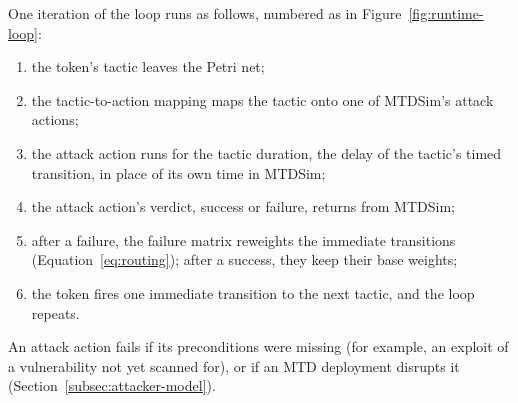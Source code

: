 \documentclass{cshonours}
\begin{document}
One iteration of the loop runs as follows, numbered as in
Figure~\ref{fig:runtime-loop}:
\begin{enumerate}[nosep, leftmargin=*]
  \item the token's tactic leaves the Petri net;
  \item the tactic-to-action mapping maps the tactic onto one of MTDSim's
  attack actions;
  \item the attack action runs for the tactic duration, the delay of the
  tactic's timed transition, in place of its own time in MTDSim;
  \item the attack action's verdict, success or failure, returns from MTDSim;
  \item after a failure, the failure matrix reweights the immediate
  transitions (Equation~\ref{eq:routing}); after a success, they keep their
  base weights;
  \item the token fires one immediate transition to the next tactic, and the
  loop repeats.
\end{enumerate}
An attack action fails if its preconditions were missing (for example, an exploit of a
vulnerability not yet scanned for), or if an MTD deployment disrupts it
(Section~\ref{subsec:attacker-model}).
\end{document}
